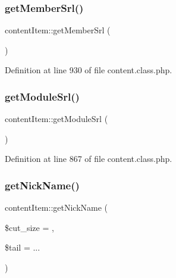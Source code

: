\mbox{\label{classcontentItem_a3356fefc2abd34642fa229f5a150cbdd}} 
\subsubsection{\texorpdfstring{get\+Member\+Srl()}{getMemberSrl()}}
{\footnotesize\ttfamily content\+Item\+::get\+Member\+Srl (\begin{DoxyParamCaption}{ }\end{DoxyParamCaption})}



Definition at line 930 of file content.\+class.\+php.

\mbox{\label{classcontentItem_a62686ab7afb76f1239a3824be0e2ded8}} 
\subsubsection{\texorpdfstring{get\+Module\+Srl()}{getModuleSrl()}}
{\footnotesize\ttfamily content\+Item\+::get\+Module\+Srl (\begin{DoxyParamCaption}{ }\end{DoxyParamCaption})}



Definition at line 867 of file content.\+class.\+php.

\mbox{\label{classcontentItem_a16947acbbeff208471271acd16d5f8f1}} 
\subsubsection{\texorpdfstring{get\+Nick\+Name()}{getNickName()}}
{\footnotesize\ttfamily content\+Item\+::get\+Nick\+Name (\begin{DoxyParamCaption}\item[{}]{\$cut\+\_\+size = {},  }\item[{}]{\$tail = {\ttfamily \textquotesingle{}...\textquotesingle{}} }\end{DoxyParamCaption})}



